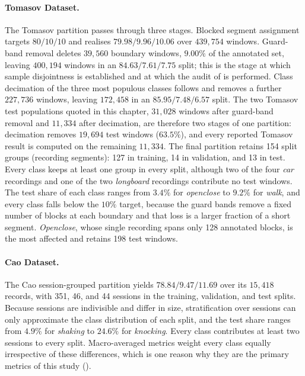 \paragraph[Tomasov Dataset]{Tomasov Dataset.}
The Tomasov partition passes through three stages. Blocked segment assignment targets $80/10/10$ and realises $79.98/9.96/10.06$ over $439{,}754$ windows. Guard-band removal deletes $39{,}560$ boundary windows, $9.00\%$ of the annotated set, leaving $400{,}194$ windows in an $84.63/7.61/7.75$ split; this is the stage at which sample disjointness is established and at which the audit of  is performed. Class decimation of the three most populous classes follows and removes a further $227{,}736$ windows, leaving $172{,}458$ in an $85.95/7.48/6.57$ split. The two Tomasov test populations quoted in this chapter, $31{,}028$ windows after guard-band removal and $11{,}334$ after decimation, are therefore two stages of one partition: decimation removes $19{,}694$ test windows ($63.5\%$), and every reported Tomasov result is computed on the remaining $11{,}334$. The final partition retains 154 split groups (recording segments): 127 in training, 14 in validation, and 13 in test. Every class keeps at least one group in every split, although two of the four \emph{car} recordings and one of the two \emph{longboard} recordings contribute no test windows. The test share of each class ranges from $3.4\%$ for \emph{openclose} to $9.2\%$ for \emph{walk}, and every class falls below the $10\%$ target, because the guard bands remove a fixed number of blocks at each boundary and that loss is a larger fraction of a short segment. \emph{Openclose}, whose single recording spans only 128 annotated blocks, is the most affected and retains 198 test windows.

\paragraph[Cao Dataset]{Cao Dataset.}
The Cao session-grouped partition yields $78.84/9.47/11.69$ over its $15{,}418$ records, with 351, 46, and 44 sessions in the training, validation, and test splits. Because sessions are indivisible and differ in size, stratification over sessions can only approximate the class distribution of each split, and the test share ranges from $4.9\%$ for \emph{shaking} to $24.6\%$ for \emph{knocking}. Every class contributes at least two sessions to every split. Macro-averaged metrics weight every class equally irrespective of these differences, which is one reason why they are the primary metrics of this study ().

